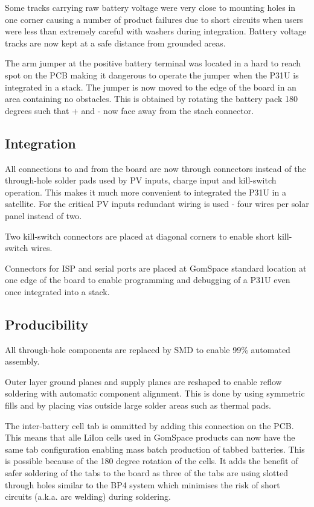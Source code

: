 \documentclass[9pt,a4paper]{article}
\begin{document}
Some tracks carrying raw battery voltage were very close to mounting
holes in one corner causing a number of product failures due to short
circuits when users were less than extremely careful with washers during
integration. Battery voltage tracks are now kept at a safe distance from
grounded areas.

The arm jumper at the positive battery terminal was located in a hard to
reach spot on the PCB making it dangerous to operate the jumper when the
P31U is integrated in a stack. The jumper is now moved to the edge of
the board in an area containing no obstacles. This is obtained by
rotating the battery pack 180 degrees such that + and - now face away
from the stach connector.

\subsection{Integration}

All connections to and from the board are now through connectors instead
of the through-hole solder pads used by PV inputs, charge input and
kill-switch operation. This makes it much more convenient to integrated
the P31U in a satellite. For the critical PV inputs redundant wiring is
used - four wires per solar panel instead of two.

Two kill-switch connectors are placed at diagonal corners to enable
short kill-switch wires.

Connectors for ISP and serial ports are placed at GomSpace standard
location at one edge of the board to enable programming and debugging of
a P31U even once integrated into a stack.

\subsection{Producibility}

All through-hole components are replaced by SMD to enable 99\% automated
assembly.

Outer layer ground planes and supply planes are reshaped to enable
reflow soldering with automatic component alignment. This is done by
using symmetric fills and by placing vias outside large solder areas
such as thermal pads.

The inter-battery cell tab is ommitted by adding this connection on the
PCB. This means that alle LiIon cells used in GomSpace products can now
have the same tab configuration enabling mass batch production of tabbed
batteries. This is possible because of the 180 degree rotation of the
cells. It adds the benefit of safer soldering of the tabs to the board
as three of the tabs are using slotted through holes similar to the BP4
system which minimises the risk of short circuits (a.k.a. arc welding)
during soldering.
\end{document}
